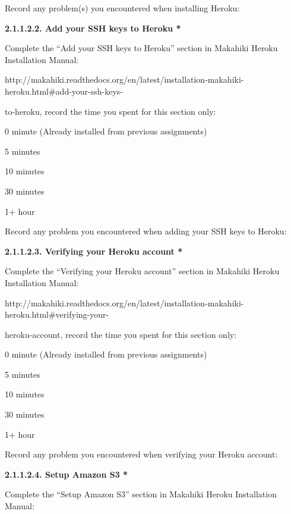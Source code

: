Record any problem(s) you encountered when installing Heroku: \underline{\hspace{4cm}}

{\bf 2.1.1.2.2. Add your SSH keys to Heroku *}

Complete the ``Add your SSH keys to Heroku'' section in Makahiki Heroku Installation Manual:

http://makahiki.readthedocs.org/en/latest/installation-makahiki-heroku.html\#add-your-ssh-keys-

to-heroku, record the time you spent for this section only:

\begin{radiobutton}
\item 0 minute (Already installed from previous assignments)
\item 5 minutes
\item  10 minutes
\item  30 minutes
\item  1+ hour
\end{radiobutton}

Record any problem you encountered when adding your SSH keys to Heroku: \underline{\hspace{3cm}}

{\bf 2.1.1.2.3. Verifying your Heroku account *}

Complete the ``Verifying your Heroku account'' section in Makahiki Heroku Installation Manual:

http://makahiki.readthedocs.org/en/latest/installation-makahiki-heroku.html\#verifying-your-

heroku-account,  record the time you spent for this section only:

\begin{radiobutton}
\item 0 minute (Already installed from previous assignments)
\item 5 minutes
\item  10 minutes
\item  30 minutes
\item  1+ hour
\end{radiobutton}

Record any problem you encountered when verifying your Heroku account: \underline{\hspace{3cm}}

{\bf 2.1.1.2.4. Setup Amazon S3 *}

Complete the ``Setup Amazon S3'' section in Makahiki Heroku Installation Manual:

